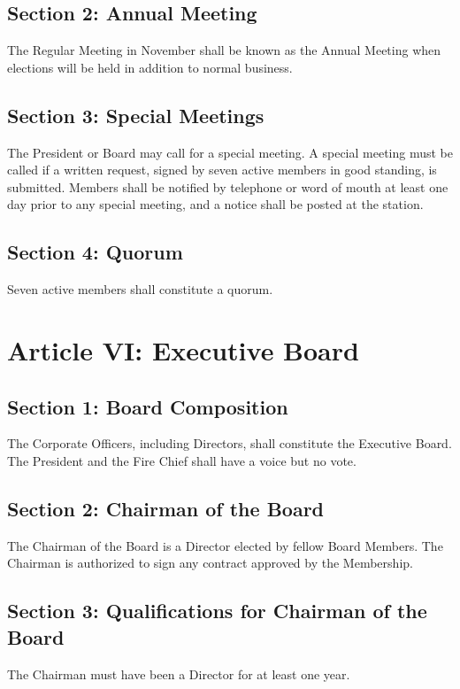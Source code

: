 ﻿\documentclass[12pt,letterpaper]{article}
\begin{document}
\subsection*{Section 2: Annual Meeting}
The Regular Meeting in November shall be known as the Annual Meeting when elections will be held in addition to normal business.

\subsection*{Section 3: Special Meetings}
The President or Board may call for a special meeting.  A special meeting must be called if a written request, signed by seven active members in good standing, is submitted.  Members shall be notified by telephone or word of mouth at least one day prior to any special meeting, and a notice shall be posted at the station.

\subsection*{Section 4: Quorum}
Seven active members shall constitute a quorum.

\section*{Article VI: Executive Board}

\subsection*{Section 1: Board Composition}
The Corporate Officers, including Directors, shall constitute the Executive Board.  The President and the Fire Chief shall have a voice but no vote.

\subsection*{Section 2: Chairman of the Board}
The Chairman of the Board is a Director elected by fellow Board Members.  The Chairman is authorized to sign any contract approved by the Membership. 

\subsection*{Section 3: Qualifications for Chairman of the Board}
The Chairman must have been a Director for at least one year.
\end{document}
